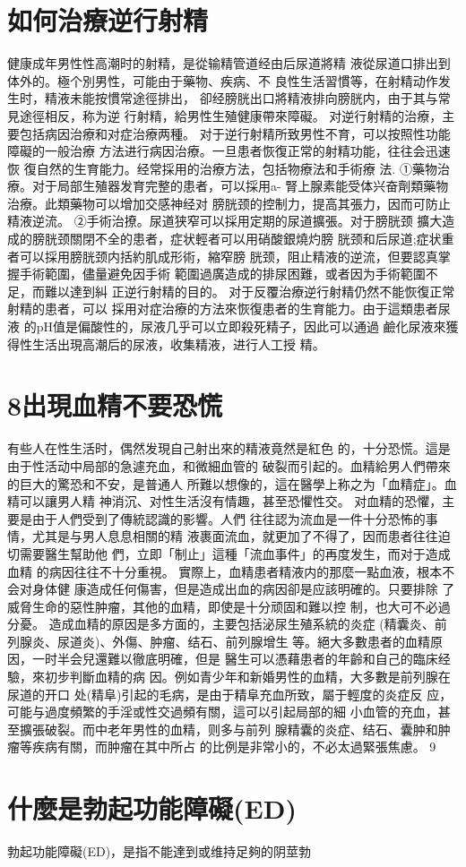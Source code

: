 \documentclass[12pt,UTF8]{ctexbook}
\begin{document}
\section{如何治療逆行射精}
健康成年男性性高潮时的射精，是從输精管道经由后尿道將精
液從尿道口排出到体外的。極个別男性，可能由于藥物、疾病、不
良性生活習慣等，在射精动作发生时，精液未能按慣常途徑排出，
卻经膀胱出口將精液排向膀胱内，由于其与常見途徑相反，称为逆
行射精，給男性生殖健康帶來障礙。
对逆行射精的治療，主要包括病因治療和对症治療两種。
对于逆行射精所致男性不育，可以按照性功能障礙的一般治療
方法进行病因治療。一旦患者恢復正常的射精功能，往往会迅速恢
復自然的生育能力。经常採用的治療方法，包括物療法和手術療
法.
①藥物治療。对于局部生殖器发育完整的患者，可以採用a-
腎上腺素能受体兴奋劑類藥物治療。此類藥物可以增加交感神经对
膀胱颈的控制力，提高其張力，因而可防止精液逆流。
②手術治撩。尿道狭窄可以採用定期的尿道擴張。对于膀胱颈
擴大造成的膀胱颈關閉不全的患者，症状輕者可以用硝酸銀燒灼膀
胱颈和后尿道;症状重者可以採用膀胱颈内括約肌成形術，縮窄膀
胱颈，阻止精液的逆流，但要認真掌握手術範圍，儘量避免因手術
範圍過廣造成的排尿困難，或者因为手術範圍不足，而難以達到糾
正逆行射精的目的。
对于反覆治療逆行射精仍然不能恢復正常射精的患者，可以
採用对症治療的方法來恢復患者的生育能力。由于這類患者尿液
的pH值是偏酸性的，尿液几乎可以立即殺死精子，因此可以通過
鹼化尿液來獲得性生活出現高潮后的尿液，收集精液，进行人工授
精。
\section{8出現血精不要恐慌}
有些人在性生活时，偶然发現自己射出來的精液竟然是紅色
的，十分恐慌。這是由于性活动中局部的急遽充血，和微細血管的
破裂而引起的。血精給男人們帶來的巨大的驚恐和不安，是普通人
所難以想像的，這在醫學上称之为「血精症」。血精可以讓男人精
神消沉、对性生活沒有情趣，甚至恐懼性交。
对血精的恐懼，主要是由于人們受到了傳統認識的影響。人們
往往認为流血是一件十分恐怖的事情，尤其是与男人息息相關的精
液裹面流血，就更加了不得了，因而患者往往迫切需要醫生幫助他
們，立即「制止」這種「流血事件」的再度发生，而对于造成血精
的病因往往不十分重視。
實際上，血精患者精液内的那麼一點血液，根本不会对身体健
康造成任何傷害，但是造成出血的病因卻是应該明確的。只要排除
了威脅生命的惡性肿瘤，其他的血精，即使是十分顽固和難以控
制，也大可不必過分憂。
造成血精的原因是多方面的，主要包括泌尿生殖系統的炎症
(精囊炎、前列腺炎、尿道炎)、外傷、肿瘤、结石、前列腺增生
等。絕大多數患者的血精原因，一时半会兒還難以徹底明確，但是
醫生可以憑藉患者的年齡和自己的臨床经驗，來初步判斷血精的病
因。例如青少年和新婚男性的血精，大多數是前列腺在尿道的开口
处(精阜)引起的毛病，是由于精阜充血所致，屬于輕度的炎症反
应，可能与過度頻繁的手淫或性交過頻有關，這可以引起局部的細
小血管的充血，甚至擴張破裂。而中老年男性的血精，则多与前列
腺精囊的炎症、结石、囊肿和肿瘤等疾病有關，而肿瘤在其中所占
的比例是非常小的，不必太過緊張焦慮。
9\section{什麼是勃起功能障礙(ED)}
勃起功能障礙(ED)，是指不能達到或维持足夠的阴莖勃
\end{document}
